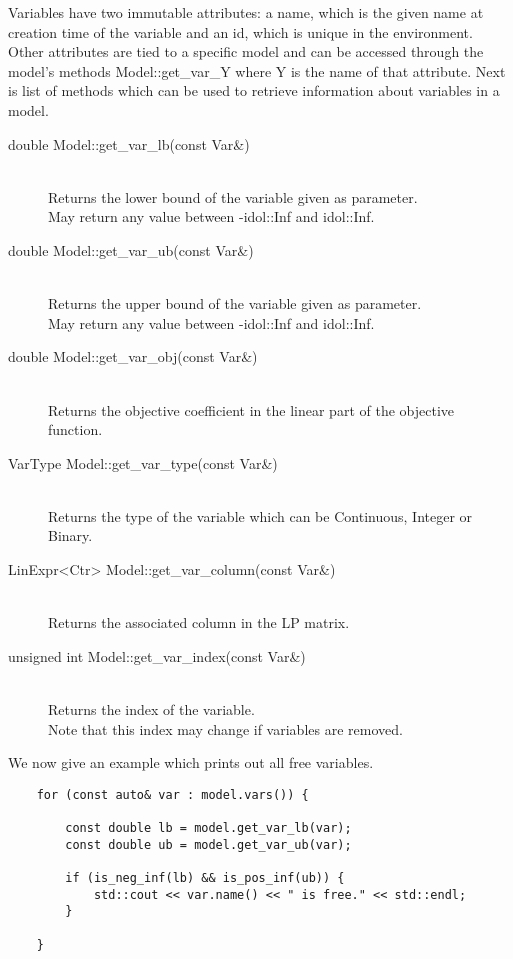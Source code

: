 Variables have two immutable attributes: a name, which is the given name at
creation time of the variable and an id, which is unique in the environment.
Other attributes are tied to a specific model and can be accessed through the
model's methods \textsf{Model::get\_var\_Y} where \textsf{Y} is the name of
that attribute. Next is list of methods which can be used to retrieve
information about variables in a model.
%
\begin{description}
    \item[\textsf{double Model::get\_var\_lb(const Var\&)}]\hphantom{.}\\
    Returns the lower bound of the variable given as parameter. \\
    May return any value between \textsf{-idol::Inf} and \textsf{idol::Inf}.
    \item[\textsf{double Model::get\_var\_ub(const Var\&)}]\hphantom{.}\\
    Returns the upper bound of the variable given as parameter. \\ 
    May return any value between \textsf{-idol::Inf} and \textsf{idol::Inf}.
    \item[\textsf{double Model::get\_var\_obj(const Var\&)}]\hphantom{.}\\
    Returns the objective coefficient in the linear part of the objective
    function.
    \item[\textsf{VarType Model::get\_var\_type(const Var\&)}]\hphantom{.}\\
    Returns the type of the variable which can be \textsf{Continuous},
    \textsf{Integer} or \textsf{Binary}.
    \item[\textsf{LinExpr<Ctr> Model::get\_var\_column(const Var\&)}]\hphantom{.}\\
    Returns the associated column in the LP matrix.
    \item[\textsf{unsigned int Model::get\_var\_index(const Var\&)}]\hphantom{.}\\
    Returns the index of the variable. \\ 
    Note that this index may change if variables are removed.
\end{description}

We now give an example which prints out all free variables. 

\begin{lstlisting}
    for (const auto& var : model.vars()) {

        const double lb = model.get_var_lb(var);
        const double ub = model.get_var_ub(var);

        if (is_neg_inf(lb) && is_pos_inf(ub)) {
            std::cout << var.name() << " is free." << std::endl;
        }

    }
\end{lstlisting}

